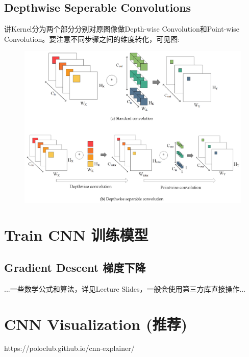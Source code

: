 \documentclass[11pt]{article}
\begin{document}
\subsection{Depthwise Seperable Convolutions}
讲Kernel分为两个部分分别对原图像做Depth-wise Convolution和Point-wise Convolution。要注意不同步骤之间的维度转化，可见图:
\begin{figure}[hbt!]
  \centering
  \includegraphics[width=\textwidth]{assets/depth.png}
\end{figure}


\newpage
\section{Train CNN 训练模型}
\subsection{Gradient Descent 梯度下降}
...一些数学公式和算法，详见Lecture Slides，一般会使用第三方库直接操作...


\section{CNN Visualization (推荐)}
https://poloclub.github.io/cnn-explainer/
\end{document}
